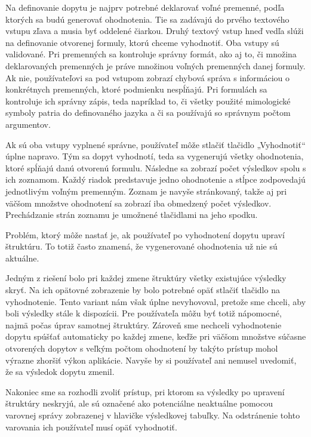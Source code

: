 Na definovanie dopytu je najprv potrebné deklarovať voľné premenné, podľa ktorých sa budú generovať ohodnotenia. Tie sa zadávajú do prvého textového vstupu zľava a musia byť oddelené čiarkou. Druhý textový vstup hneď vedľa slúži na definovanie otvorenej formuly, ktorú chceme vyhodnotiť. Oba vstupy sú validované. Pri premenných sa kontroluje správny formát, ako aj to, či množina deklarovaných premenných je práve množinou voľných premenných danej formuly. Ak nie, používateľovi sa pod vstupom zobrazí chybová správa s informáciou o konkrétnych premenných, ktoré podmienku nespĺňajú. Pri formulách sa kontroluje ich správny zápis, teda napríklad to, či všetky použité mimologické symboly patria do definovaného jazyka a či sa používajú so správnym počtom argumentov.


Ak sú oba vstupy vyplnené správne, používateľ môže stlačiť tlačidlo „Vyhodnotiť“ úplne napravo. Tým sa dopyt vyhodnotí, teda sa vygenerujú všetky ohodnotenia, ktoré spĺňajú danú otvorenú formulu. Následne sa zobrazí počet výsledkov spolu s ich zoznamom. Každý riadok predstavuje jedno ohodnotenie a stĺpce zodpovedajú jednotlivým voľným premenným. Zoznam je navyše stránkovaný, takže aj pri väčšom množstve ohodnotení sa zobrazí iba obmedzený počet výsledkov. Prechádzanie strán zoznamu je umožnené tlačidlami na jeho spodku.

Problém, ktorý môže nastať je, ak používateľ po vyhodnotení dopytu upraví štruktúru. To totiž často znamená, že vygenerované ohodnotenia už nie sú aktuálne.

Jedným z riešení bolo pri každej zmene štruktúry všetky existujúce výsledky skryť. Na ich opätovné zobrazenie by bolo potrebné opäť stlačiť tlačidlo na vyhodnotenie. Tento variant nám však úplne nevyhovoval, pretože sme chceli, aby boli výsledky stále k dispozícii. Pre používateľa môžu byť totiž nápomocné, najmä počas úprav samotnej štruktúry. Zároveň sme nechceli vyhodnotenie dopytu spúšťať automaticky po každej zmene, keďže pri väčšom množstve súčasne otvorených dopytov s veľkým počtom ohodnotení by takýto prístup mohol výrazne zhoršiť výkon aplikácie. Navyše by si používateľ ani nemusel uvedomiť, že sa výsledok dopytu zmenil.

Nakoniec sme sa rozhodli zvoliť prístup, pri ktorom sa výsledky po upravení štruktúry neskryjú, ale sú označené ako potenciálne neaktuálne pomocou varovnej správy zobrazenej v hlavičke výsledkovej tabuľky. Na odstránenie tohto varovania ich používateľ musí opäť vyhodnotiť.

